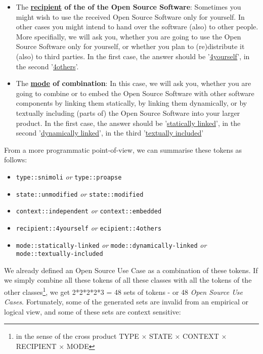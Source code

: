 \begin{itemize}
  \item The \textbf{\underline{recipient} of the of the Open Source Software}:
  Sometimes you might wish to use the received Open Source Software only for
  yourself. In other cases you might intend to hand over the software (also) to
  other people. More specifially, we will ask you, whether you are going to use
  the Open Source Software only for yourself, or whether you plan to
  (re)distribute it (also) to third parties. In the first case, the answer
  should be '\underline{4yourself}', in the second '\underline{4others}'.
 
  \item The \textbf{\underline{mode} of combination}: In this case, we will ask
  you, whether you are going to combine or to embed the Open Source Software
  with other software components by linking them statically, by linking them
  dynamically, or by textually including (parts of) the Open Source Software
  into your larger product. In the first case, the answer should be
  '\underline{statically linked}', in the second '\underline{dynamically
  linked}', in the third '\underline{textually included}'
  
\end{itemize}

From a more programmatic point-of-view, we can summarise these tokens as follows:

\begin{itemize}
  \item \texttt{type::snimoli} \emph{or} \texttt{type::proapse}
  \item \texttt{state::unmodified} \emph{or} \texttt{state::modified}
  \item \texttt{context::independent} \emph{or} \texttt{context::embedded}
  \item \texttt{recipient::4yourself} \emph{or} \texttt{ecipient::4others}
  \item \texttt{mode::statically-linked} \emph{or} \texttt{mode::dynamically-linked}
   \emph{or} \\ \texttt{mode::textually-included}
\end{itemize}

We already defined an Open Source Use Case as a combination of these tokens. If
we simply combine all these tokens of all these classes with all the tokens of
the other classes\footnote{in the sense of the cross product TYPE $\times$ STATE
$\times$ CONTEXT $\times$ RECIPIENT $\times$ MODE}, we get 2*2*2*2*3 = 48 sets
of tokens - or 48 \emph{Open Source Use Cases}. Fortunately, some of the
generated sets are invalid from an empirical or logical view, and some of these
sets are context sensitive:
\label{InvalidFinderTokenCombinations}

